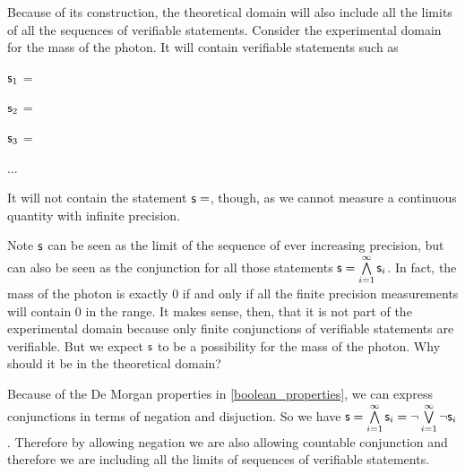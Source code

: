 \documentclass[11pt,letterpaper,fleqn]{memoir} %
\begin{document}
Because of its construction, the theoretical domain will also include all the limits of all the sequences of verifiable statements. Consider the experimental domain for the mass of the photon. It will contain verifiable statements such as
\begin{description}
	\item $\mathsf{s}_1$ =
	\item $\mathsf{s}_2$ =
	\item $\mathsf{s}_3$ =
	\item ...
\end{description}
It will not contain the statement $\mathsf{s}=$, though, as we cannot measure a continuous quantity with infinite precision.

Note $\mathsf{s}$ can be seen as the limit of the sequence of ever increasing precision, but can also be seen as the conjunction for all those statements $\mathsf{s}=\bigwedge\limits_{i=1}^{\infty} \mathsf{s}_i$. In fact, the mass of the photon is exactly 0 if and only if all the finite precision measurements will contain 0 in the range. It makes sense, then, that it is not part of the experimental domain because only finite conjunctions of verifiable statements are verifiable. But we expect $\mathsf{s}$ to be a possibility for the mass of the photon. Why should it be in the theoretical domain?

Because of the De Morgan properties in \ref{boolean_properties}, we can express conjunctions in terms of negation and disjuction. So we have $\mathsf{s}=\bigwedge\limits_{i=1}^{\infty} \mathsf{s}_i=\neg \bigvee\limits_{i=1}^{\infty} \neg\mathsf{s}_i$. Therefore by allowing negation we are also allowing countable conjunction and therefore we are including all the limits of sequences of verifiable statements.

\end{document}
